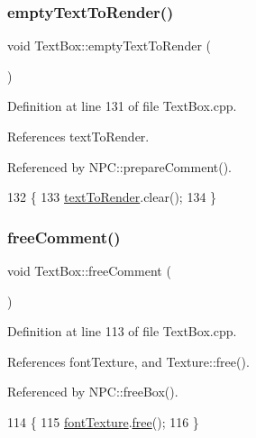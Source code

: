 \mbox{\label{class_text_box_a3c57ce309c31e346dbc504b5e23d7ebc}} 
\subsubsection{\texorpdfstring{empty\+Text\+To\+Render()}{emptyTextToRender()}}
{\footnotesize\ttfamily void Text\+Box\+::empty\+Text\+To\+Render (\begin{DoxyParamCaption}{ }\end{DoxyParamCaption})}



Definition at line 131 of file Text\+Box.\+cpp.



References text\+To\+Render.



Referenced by N\+P\+C\+::prepare\+Comment().


\begin{DoxyCode}
132 \{
133     \hyperlink{class_text_box_a13ec32aabf23db2253af70f19a2bf1e9}{textToRender}.clear();
134 \}
\end{DoxyCode}
\mbox{\label{class_text_box_a6ab09c23671be63b41bd0eba32d385e3}} 
\subsubsection{\texorpdfstring{free\+Comment()}{freeComment()}}
{\footnotesize\ttfamily void Text\+Box\+::free\+Comment (\begin{DoxyParamCaption}{ }\end{DoxyParamCaption})}



Definition at line 113 of file Text\+Box.\+cpp.



References font\+Texture, and Texture\+::free().



Referenced by N\+P\+C\+::free\+Box().


\begin{DoxyCode}
114 \{
115     \hyperlink{class_text_box_a94e1863fccbb2e8de3547aa89b8e85f0}{fontTexture}.\hyperlink{class_texture_a46d06aec832e5a954f1c8ca957c2c6e5}{free}();
116 \}
\end{DoxyCode}
\mbox{\label{class_text_box_a47653c059e6074242066423bad187fb6}} 
